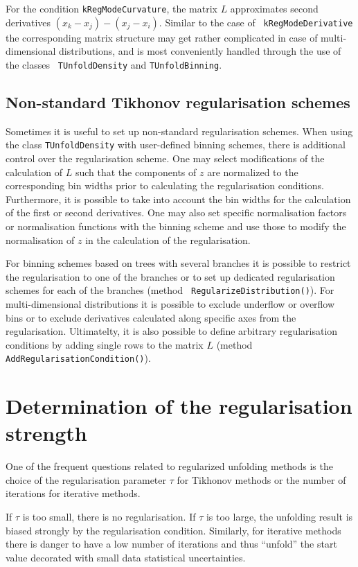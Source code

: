 \documentclass[12pt]{article}
\begin{document}
For the condition {\tt kRegModeCurvature}, the matrix $L$ approximates
second derivatives $(x_k-x_j)-(x_j-x_i)$. Similar to the case of {\tt
  kRegModeDerivative} the corresponding matrix structure may get
rather complicated in case of multi-dimensional distributions, and is
most conveniently handled through the use of the classes {\tt
  TUnfoldDensity} and {\tt TUnfoldBinning}.

\subsection{Non-standard Tikhonov regularisation schemes}

Sometimes it is useful to set up non-standard regularisation
schemes. When using the class {\tt TUnfoldDensity} with user-defined
binning schemes, there is additional control over the regularisation
scheme. One may select modifications of the calculation of $L$ such
that the components of $z$ are normalized to the corresponding bin widths
prior to calculating the regularisation conditions. Furthermore, it is
possible to take into account the bin widths for the calculation of
the first or second derivatives. One may also set specific
normalisation factors or normalisation functions with the binning
scheme and use those to modify the normalisation of $z$ in the
calculation of the regularisation. 

For binning schemes based on trees with several branches it is possible
to restrict the regularisation to one of the branches or to set up
dedicated regularisation schemes for each of the branches (method {\tt
RegularizeDistribution()}).
For multi-dimensional distributions it is possible to exclude
underflow or overflow bins or to exclude derivatives calculated along
specific axes from the regularisation. Ultimatelty, it is also
possible to define arbitrary regularisation conditions by adding
single rows to the matrix $L$ (method {\tt AddRegularisationCondition()}).

\section{Determination of the regularisation strength}

One of the frequent questions related to regularized unfolding methods
is the choice of the regularisation parameter $\tau$ for Tikhonov
methods or the number of iterations for iterative methods.

If $\tau$ is too small, there is no
regularisation. If $\tau$ is too large, the unfolding result is
biased strongly by the regularisation condition. Similarly, for
iterative methods there is danger to have a low number of iterations
and thus ``unfold'' the start value decorated with small data
statistical uncertainties.
\end{document}
